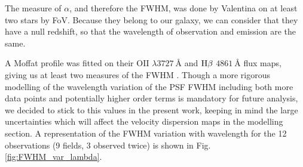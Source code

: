 The measure of $\alpha$, and therefore the FWHM, was done by Valentina on at least two stars by FoV. Because they belong to our galaxy, we can consider that they have a null redshift, so that the wavelength of observation and emission are the same.

 A Moffat profile was fitted on their OII $\lambda \SI{3727}{\angstrom}$ and $\rm{H\beta}$ $\SI{4861}{\angstrom}$ flux maps, giving us at least two measures of the FWHM . Though a more rigorous modelling of the wavelength variation of the PSF FWHM including both more data points and potentially higher order terms is mandatory for future analysis, we decided to stick to this values in the present work, keeping in mind the large uncertainties which will affect the velocity dispersion maps in the modelling section. A representation of the FWHM variation with wavelength for the 12 observations (9 fields, 3 observed twice)
is shown in Fig.\,\ref{fig:FWHM_var_lambda}.





 

